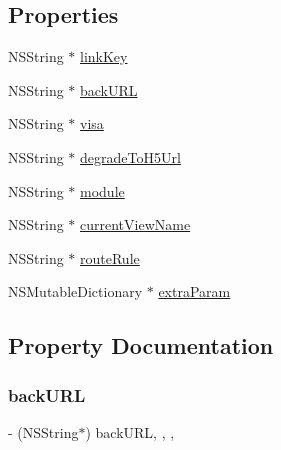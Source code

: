 \subsection*{Properties}
\begin{DoxyCompactItemize}
\item 
N\+S\+String $\ast$ \mbox{\hyperlink{interface_a_l_p_jump_param_a3237989758020162fe2f2a63e08bec91}{link\+Key}}
\item 
N\+S\+String $\ast$ \mbox{\hyperlink{interface_a_l_p_jump_param_a77c3de7985097fe60ca39b76e94b8525}{back\+U\+RL}}
\item 
N\+S\+String $\ast$ \mbox{\hyperlink{interface_a_l_p_jump_param_ad91224f6c812c2a520b692e703f7fc17}{visa}}
\item 
N\+S\+String $\ast$ \mbox{\hyperlink{interface_a_l_p_jump_param_a5823fceae9f7687ebcd8c09de929dc69}{degrade\+To\+H5\+Url}}
\item 
N\+S\+String $\ast$ \mbox{\hyperlink{interface_a_l_p_jump_param_a0c9f52786d16faa0daf5f8dcc939572d}{module}}
\item 
N\+S\+String $\ast$ \mbox{\hyperlink{interface_a_l_p_jump_param_af7be105e361782d95dc4d4762c782523}{current\+View\+Name}}
\item 
N\+S\+String $\ast$ \mbox{\hyperlink{interface_a_l_p_jump_param_aaf321b74f7d51bc268e28dc55f87c63c}{route\+Rule}}
\item 
N\+S\+Mutable\+Dictionary $\ast$ \mbox{\hyperlink{interface_a_l_p_jump_param_a644520fd7a7da013106941b8844eb8e2}{extra\+Param}}
\end{DoxyCompactItemize}


\subsection{Property Documentation}
\mbox{\label{interface_a_l_p_jump_param_a77c3de7985097fe60ca39b76e94b8525}} 
\subsubsection{\texorpdfstring{back\+U\+RL}{backURL}}
{\footnotesize\ttfamily -\/ (N\+S\+String$\ast$) back\+U\+RL\hspace{0.3cm}{\ttfamily [read]}, {\ttfamily [write]}, {\ttfamily [nonatomic]}, {\ttfamily [copy]}}


